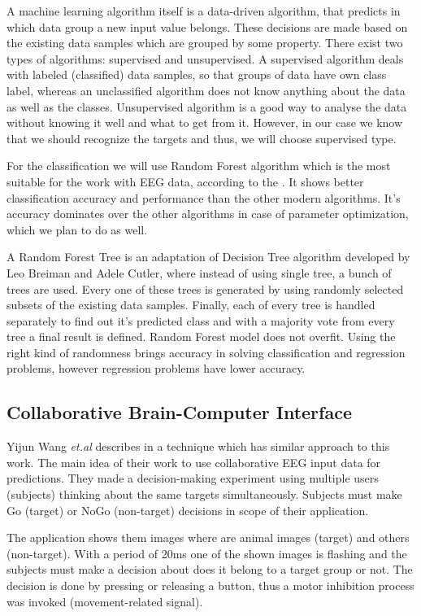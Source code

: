 \documentclass[12pt]{article}
\begin{document}
A machine learning algorithm itself is a data-driven algorithm, that predicts in which data group a new input value belongs. These decisions are made based on the existing data samples which are grouped by some property. There exist two types of algorithms: supervised and unsupervised. A supervised algorithm deals with labeled (classified) data samples, so that groups of data have own class label, whereas an unclassified algorithm does not know anything about the data as well as the classes. Unsupervised algorithm is a good way to analyse the data without knowing it well and what to get from it. However, in our case we know that we should recognize the targets and thus, we will choose supervised type.

For the classification we will use Random Forest algorithm which is the most suitable for the work with EEG data, according to the \cite{masso}. It shows better classification accuracy and performance than the other modern algorithms. It's accuracy dominates over the other algorithms in case of parameter optimization, which we plan to do as well. 

A Random Forest Tree is an adaptation of Decision Tree algorithm developed by Leo Breiman and Adele Cutler, where instead of using single tree, a bunch of trees are used. Every one of these trees is generated by using randomly selected subsets of the existing data samples. Finally, each of every tree is handled separately to find out it's predicted class and with a majority vote from every tree a final result is defined. Random Forest model does not overfit. Using the right kind of randomness brings accuracy in solving classification and regression problems, however regression problems have lower accuracy.\cite{breiman_rf}

\subsection{Collaborative Brain-Computer Interface}

Yijun Wang {\it et.al} describes in \cite{collaborative_wang} a technique which has similar approach to this work. The main idea of their work to use collaborative EEG input data for predictions. They made a decision-making experiment using multiple users (subjects) thinking about the same targets simultaneously. Subjects must make Go (target) or NoGo (non-target) decisions in scope of their application. 

The application shows them images where are animal images (target) and others (non-target). With a period of 20ms one of the shown images is flashing and the subjects must make a decision about does it belong to a target group or not. The decision is done by pressing or releasing a button, thus a motor inhibition process was invoked (movement-related signal). 
\end{document}

